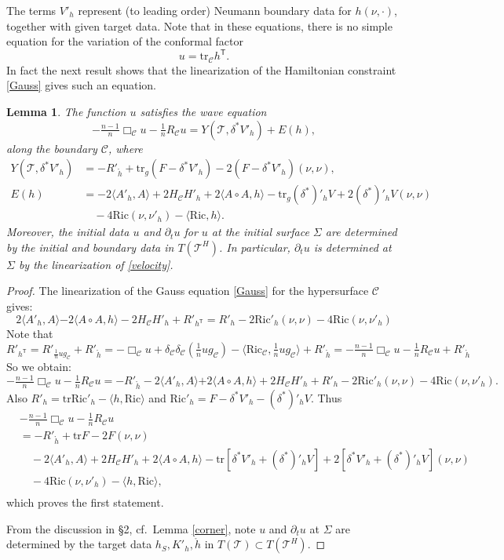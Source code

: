\documentclass[10pt]{amsart}
\renewcommand{\d}{\delta}
\newcommand{\Si}{\Sigma}
\newcommand{\cC}{{\mathcal C}}
\newcommand{\cT}{{\mathcal T}}
\newcommand{\Ric}{\mathrm{Ric}}
\newcommand{\tT}{\mathsf{T}}
\newcommand{\be}{\begin{equation}}
\newcommand{\ee}{\end{equation}}
\newcommand{\bes}{\begin{equation*}}
\newcommand{\ees}{\end{equation*}}
\newcommand{\tr}{\mathrm{tr}}
\newcommand{\p}{\partial}
\newcommand{\<}{\langle}
\renewcommand{\>}{\rangle}
\theoremstyle{plain}
\newtheorem{lemma}{Lemma}[section]
\theoremstyle{remark}
\theoremstyle{definition}
\numberwithin{equation}{section}
\begin{document}
The terms $V'_h$ represent (to leading order) Neumann boundary data for $h(\nu, \cdot)$, together with given target data. Note that in these equations, 
there is no simple equation for the variation of the conformal factor 
$$u = \tr_{\cC}h^{\tT}.$$
In fact the next result shows that the linearization of the Hamiltonian constraint \eqref{Gauss} gives such an equation. 

\begin{lemma}\label{u}
The function $u$ satisfies the wave equation 
\be \label{uC}
-\tfrac{n-1}{n}\Box_\cC u-\tfrac{1}{n}R_\cC u = Y(\cT, \d^* V'_h) + E(h),
\ee
along the boundary $\cC$, where 
\be \label{uinhom}
\begin{split}
Y(\cT, \d^*V'_h)&=-R'_{\ring{h}} +\tr_g (F - \d^*V'_h) - 2 (F - \d^*V'_h)(\nu,\nu),\\
E(h)&= -2\<A'_h, A\> + 2H_{\cC}H'_h + 2\<A\circ A ,h\> - \tr_g (\d^*)'_h V + 2(\d^*)'_h V(\nu,\nu)\\
&\quad-4\Ric(\nu,\nu'_h) - \<\Ric, h\>.
\end{split}
\ee
Moreover, the initial data $u$ and $\p_t u$ for $u$ at the initial surface $\Si$ are determined by the initial and boundary data 
in $T(\cT^H)$. In particular, $\p_t u$ is determined at $\Si$ by the linearization of \eqref{velocity}. 

\end{lemma} 

\begin{proof} 
The linearization of the Gauss equation \eqref{Gauss} for the hypersurface $\cC$ gives:
\bes
2\<A'_h, A\>{ -2\<A\circ A, h\>}-2H_\cC H'_h + R'_{h^{\tT}}=R'_h-2\Ric'_h(\nu,\nu)-4\Ric(\nu,\nu'_h)
\ees
Note that 
\bes
R'_{h^{\tT}}=R'_{\tfrac{1}{n}ug_{\cC}}+R'_{\ring{h}}=-\Box_\cC u+\d_\cC\d_\cC(\tfrac{1}{n}ug_\cC)-\<\Ric_\cC,\tfrac{1}{n}ug_\cC\> + R'_{\ring{h}}=
-\tfrac{n-1}{n}\Box_\cC u-\tfrac{1}{n}R_\cC u+R'_{\ring{h}}
\ees
So we obtain:
\bes
-\tfrac{n-1}{n}\Box_\cC u-\tfrac{1}{n}R_\cC u=-R'_{\ring{h}}-2\<A'_h, A\>{ +2\<A\circ A,h\>}+2H_\cC H'_h+R'_h-2\Ric'_h(\nu,\nu)-4\Ric(\nu,\nu'_h). 
\ees
Also $R'_h=\tr \Ric'_h-\<h,\Ric\>$ and $\Ric'_h=F-\d^* V'_h-(\d^*)'_h V$. Thus
\bes\begin{split}
&-\tfrac{n-1}{n}\Box_\cC u-\tfrac{1}{n}R_\cC u\\
&=-R'_{\ring{h}} + \tr F -2F(\nu,\nu)\\
&\quad-2\<A'_h, A\> + 2H_{\cC}H'_h +2\<A\circ A,h\> - \tr [\d^*V'_h+(\d^*)'_h V] + 2[\d^*V'_h + (\d^*)'_h V](\nu,\nu) \\
&\quad - 4\Ric(\nu,\nu'_h) - \<h, \Ric\>,\\
\end{split}\ees
which proves the first statement. 

From the discussion in \S 2, cf.~Lemma \ref{corner}, note $u$ and $\p_t u$ at $\Si$ are determined by the target data 
$h_S, K'_h, \ring{h}$ in $T(\cT) \subset T(\cT^H)$. 

\end{proof}
\end{document}
